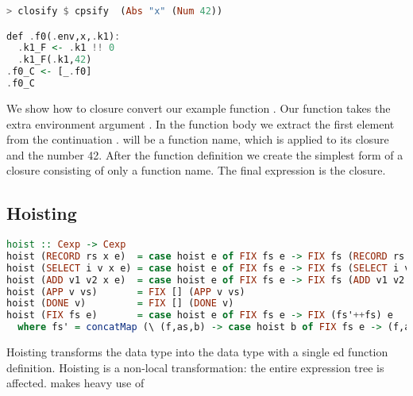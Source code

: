 \begin{lstlisting}[language=Haskell]
> closify $ cpsify  (Abs "x" (Num 42))

def .f0(.env,x,.k1):
  .k1_F <- .k1 !! 0
  .k1_F(.k1,42)
.f0_C <- [_.f0]
.f0_C
\end{lstlisting}

We show how to closure convert our example function . Our function  takes the extra environment argument . In the function body we extract the first element from the continuation .  will be a function name, which is applied to its closure and the number 42. After the function definition we create the simplest form of a closure consisting of only a function name. The final expression is the closure.

\subsection{\label{subsection:hoist}Hoisting}
\begin{lstlisting}[language=Haskell]
hoist :: Cexp -> Cexp
hoist (RECORD rs x e)  = case hoist e of FIX fs e -> FIX fs (RECORD rs x e)
hoist (SELECT i v x e) = case hoist e of FIX fs e -> FIX fs (SELECT i v x e)
hoist (ADD v1 v2 x e)  = case hoist e of FIX fs e -> FIX fs (ADD v1 v2 x e)
hoist (APP v vs)       = FIX [] (APP v vs)
hoist (DONE v)         = FIX [] (DONE v)               
hoist (FIX fs e)       = case hoist e of FIX fs e -> FIX (fs'++fs) e
  where fs' = concatMap (\ (f,as,b) -> case hoist b of FIX fs e -> (f,as,e) : fs) fs
\end{lstlisting}

Hoisting transforms the  data type into the  data type with a single ed function definition. Hoisting is a non-local transformation: the entire expression tree is affected.  makes heavy use of 

